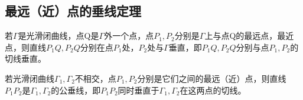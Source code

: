 \subsection{最远（近）点的垂线定理}
若\(\Gamma\)是光滑闭曲线，点Q是\(\Gamma\)外一个点，点\(P_1, P_2\)分别是\(\Gamma\)上与点Q的最远点，最近点，则直线\(P_1Q, P_2Q\)分别在点\(P_1\)处，\(P_2\)处与\(\Gamma\)垂直，即\(P_1Q, P_2Q\)分别与点\(P_1, P_2\)的切线垂直。

若光滑闭曲线\(\Gamma_1, \Gamma_2\)不相交，点\(P_1, P_2\)分别是它们之间的最远（近）点，则直线\(P_1P_2\)是\(\Gamma_1, \Gamma_2\)的公垂线，即\(P_1P_2\)同时垂直于\(\Gamma_1, \Gamma_2\)在这两点的切线。



